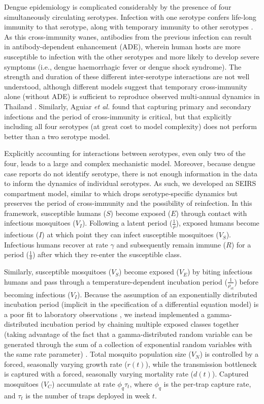 \documentclass[10pt,letterpaper]{article}
\begin{document}
Dengue epidemiology is complicated considerably by the presence of four simultaneously circulating serotypes.
Infection with one serotype confers life-long immunity to that serotype, along with temporary immunity to other serotypes \cite{Wearing2006}.  
As this cross-immunity wanes, antibodies from the previous infection can result in antibody-dependent enhancement (ADE), wherein human hosts are more susceptible to infection with the other serotypes and more likely to develop severe symptoms (i.e., dengue haemorrhagic fever or dengue shock syndrome)\cite{Wearing2006}.
The strength and duration of these different inter-serotype interactions are not well understood, although different models suggest that temporary cross-immunity alone (without ADE) is sufficient to reproduce observed multi-annual dynamics in Thailand \cite{Wearing2006,Reich2013}.
Similarly, Aguiar \emph{et al.} \cite{Aguiar2013} found that capturing primary and secondary infections and the period of cross-immunity is critical, but that explicitly including all four serotypes (at great cost to model complexity) does not perform better than a two serotype model.

Explicitly accounting for interactions between serotypes, even only two of the four, leads to a large and complex mechanistic model.
Moreover, because dengue case reports do not identify serotype, there is not enough information in the data to inform the dynamics of individual serotypes.
As such, we developed an SEIRS compartment model, similar to \cite{Newton1992, Burattini2008, Pinho2010} which drops serotype-specific dynamics but preserves the period of cross-immunity and the possibility of reinfection.
In this framework, susceptible humans ($S$) become exposed ($E$) through contact with infectious mosquitoes ($V_I$).
Following a latent period ($\frac{1}{\rho}$), exposed humans become infectious ($I$) at which point they can infect susceptible mosquitoes ($V_S$).
Infectious humans recover at rate $\gamma$ and subsequently remain immune ($R$) for a period ($\frac{1}{\delta}$) after which they re-enter the susceptible class.

Similarly, susceptible mosquitoes ($V_S$) become exposed ($V_E$) by biting infectious humans and pass through a temperature-dependent incubation period ($\frac{1}{\rho_{vt}}$) before becoming infectious ($V_I$).
Because the assumption of an exponentially distributed incubation period (implicit in the specification of a differential equation model) is a poor fit to laboratory observations \cite{Chan2012}, we instead implemented a gamma-distributed incubation period by chaining multiple exposed classes together (taking advantage of the fact that a gamma-distributed random variable can be generated through the sum of a collection of exponential random variables with the same rate parameter) \cite{Lloyd2001}.
Total mosquito population size ($V_N$) is controlled by a forced, seasonally varying growth rate ($r(t)$), while the transmission bottleneck is captured with a forced, seasonally varying mortality rate ($d(t)$).
Captured mosquitoes ($V_C$) accumulate at rate $\phi_q \tau_t$, where $\phi_q$ is the per-trap capture rate, and $\tau_t$ is the number of traps deployed in week $t$.
\end{document}
